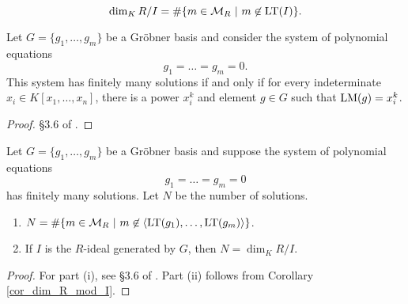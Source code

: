 \begin{corollary}
  \label{cor_dim_R_mod_I}
  $$\dim_K R/I = \#\{ m \in \mathcal{M}_R ~|~ m \not\in \operatorname{LT}(I)\}.$$
\end{corollary}
\begin{theorem}
  Let $G = \{g_1, \ldots, g_m\}$ be a Gr\"obner basis and consider the system of polynomial equations
  \[g_1 = \ldots = g_m = 0.\]
  This system has finitely many solutions if and only if for every indeterminate $x_i \in K[x_1, \ldots, x_n]$,
  there is a power $x_i^k$ and element $g \in G$ such that $\operatorname{LM}(g) = x_i^k$.
\end{theorem}
\begin{proof}
  \S 3.6 of \cite{buchberger98}.
\end{proof}

\begin{theorem}
  Let $G = \{g_1, \ldots, g_m\}$ be a Gr\"obner basis and suppose the system of polynomial equations
  \[g_1 = \ldots = g_m = 0\]
  has finitely many solutions.
  Let $N$ be the number of solutions.
  \begin{enumerate}[label=(\roman*)]
    \item $N = \#\{ m \in \mathcal{M}_R ~|~ m \not\in \left\langle \operatorname{LT}(g_1), \ldots, \operatorname{LT}(g_m) \right\rangle \}$.
    \item If $I$ is the $R$-ideal generated by $G$, then $N = \dim_K R/I$.
  \end{enumerate}
\end{theorem}
\begin{proof}
  For part (i), see \S 3.6 of \cite{buchberger98}.
  Part (ii) follows from Corollary \ref{cor_dim_R_mod_I}.
\end{proof}
